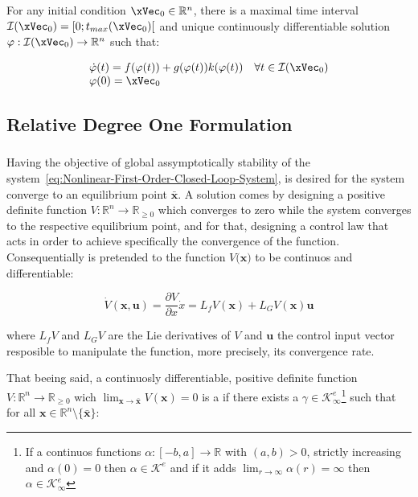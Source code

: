 For any initial condition \(\xVec_0 \in \mathbb{R}^n\), there is a maximal time interval \(\mathcal{I}(\xVec_0) = [0; t_{max}(\xVec_0)[ \) and unique continuously differentiable solution \(\varphi: \mathcal{I}(\xVec_0) \to \mathbb{R}^n \) such that:

\begin{equation}
    \begin{array}{l}
        \dot{\varphi}(t) = f(\varphi(t))+ g(\varphi(t))k(\varphi(t)) \quad \forall t \in \mathcal{I}(\xVec_0)  \\
        \varphi(0) = \xVec_0
    \end{array}
 \label{eq:Nonlinear-First-Order-Closed-Loop-System-UniqueSol}
\end{equation}


\subsection{Relative Degree One Formulation}
\label{sub:formulation}

\subsubsection{}
\label{subsub:control_lyapunov_function}

Having the objective of global assymptotically stability of the system~\ref{eq:Nonlinear-First-Order-Closed-Loop-System}, is desired for the system converge to an equilibrium point \( \bar{\mathbf{x}} \). A solution comes by designing a positive definite function \( V: \mathbb{R}^n \rightarrow \mathbb{R}_{\geq 0} \) which converges to zero while the system converges to the respective equilibrium point, and for that, designing a control law that acts in order to achieve specifically the convergence of the function. Consequentially is pretended to the function \( V\mathbf(\mathbf{x}) \) to be continuos and differentiable:

\[\dot{V} (\mathbf{x}, \mathbf{u}) = \frac{\partial V}{\partial x}\dot{x} = L_fV(\mathbf{x}) + L_GV(\mathbf{x})\mathbf{u} \]

where \(L_fV\) and \(L_GV\) are the Lie derivatives of \(V\) and \(\mathbf{u}\) the control input vector resposible to manipulate the function, more precisely, its convergence rate.\par

That beeing said, a continuosly differentiable, positive definite function \( V: \mathbb{R}^n \rightarrow \mathbb{R}_{\geq 0}  \) wich \( \lim_{\mathbf{x} \to \bar{\mathbf{x}}}{V(\mathbf{x})} = 0 \) is a  if there exists a \( \gamma \in \mathcal{K}^e_{\infty}  \)\footnote{If a continuos functions \(\alpha:[-b,a] \to \mathbb{R}\) with \((a,b) > 0\), strictly increasing and \(\alpha(0) = 0\) then \(\alpha \in \mathcal{K}^e\) and if it adds \(\lim_{r \to \infty} \alpha(r) = \infty\) then \(\alpha \in \mathcal{K}^e_{\infty}\)}  such that for all \( \mathbf{x} \in \mathbb{R}^n \setminus \{\bar{\mathbf{x}}\} \):

